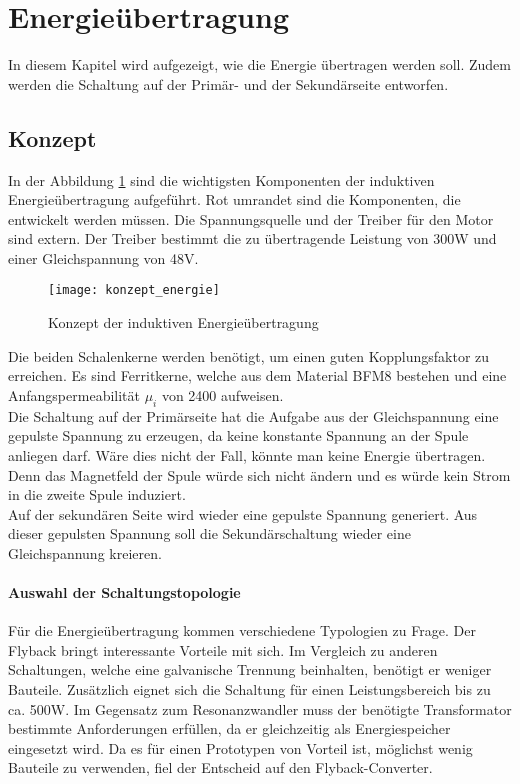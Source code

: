 \section{Energieübertragung}\label{sec:energie}
In diesem Kapitel wird aufgezeigt, wie die Energie übertragen werden soll. Zudem werden die Schaltung auf der Primär- und der Sekundärseite entworfen.

\subsection{Konzept}
In der Abbildung \ref{fig:konzept_energie} sind die wichtigsten Komponenten der induktiven Energieübertragung aufgeführt. Rot umrandet sind die Komponenten, die entwickelt werden müssen. Die Spannungsquelle und der Treiber für den Motor sind extern. Der Treiber bestimmt die zu übertragende Leistung von 300W und einer Gleichspannung von 48V.

\begin{figure}[h]
	\centering
	\texttt{[image: konzept\_energie]}
	\caption{Konzept der induktiven Energieübertragung}\label{fig:konzept_energie}
\end{figure}

Die beiden Schalenkerne werden benötigt, um einen guten Kopplungsfaktor zu erreichen. Es sind Ferritkerne, welche aus dem Material BFM8 bestehen und eine Anfangspermeabilität $ \mu_{i} $ von 2400 aufweisen.\\ Die Schaltung auf der Primärseite hat die Aufgabe aus der Gleichspannung eine gepulste Spannung zu erzeugen, da keine konstante Spannung an der Spule anliegen darf. Wäre dies nicht der Fall, könnte man keine Energie übertragen. Denn das Magnetfeld der Spule würde sich nicht ändern und es würde kein Strom in die zweite Spule induziert. \\
Auf der sekundären Seite wird wieder eine gepulste Spannung generiert. Aus dieser gepulsten Spannung soll die Sekundärschaltung wieder eine Gleichspannung kreieren.

\paragraph{Auswahl der Schaltungstopologie}
Für die Energieübertragung kommen verschiedene Typologien zu Frage. Der Flyback bringt interessante Vorteile mit sich. Im Vergleich zu anderen Schaltungen, welche eine galvanische Trennung beinhalten, benötigt er weniger Bauteile. Zusätzlich eignet sich die Schaltung für einen Leistungsbereich bis zu ca. 500W. Im Gegensatz zum Resonanzwandler muss der benötigte Transformator bestimmte Anforderungen erfüllen, da er gleichzeitig als Energiespeicher eingesetzt wird. Da es für einen Prototypen von Vorteil ist, möglichst wenig Bauteile zu verwenden, fiel der Entscheid auf den Flyback-Converter. \cite{bachelor} \cite{speerwandler}

